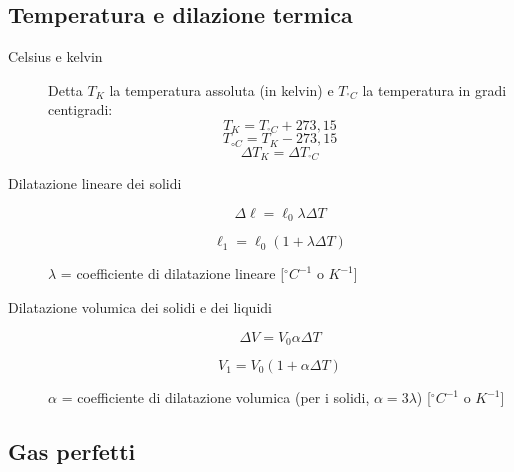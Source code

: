 \documentclass[a4paper,11pt,italian]{article}
\begin{document}
\subsection{Temperatura e dilazione termica}

\begin{description}
  \item[Celsius e kelvin]
  Detta $ T_K $ la temperatura assoluta (in kelvin) e $ T_{^{\circ}C} $ la temperatura in gradi centigradi:
  \[ T_K = T_{^{\circ}C} + 273,15 \]
  \[ T_{{\circ}C} = T_{K} - 273,15 \]
  \[ \Delta T_K = \Delta T_{^{\circ}C} \]
  
  \item[Dilatazione lineare dei solidi] 
  \[ \Delta \ell = \ell_0 \lambda \Delta T \]
\begin{soloscientifico} %
  \[ \ell_1 = \ell_0 (1 + \lambda \Delta T) \]
\end{soloscientifico}   %
  $ \lambda $ = coefficiente di dilatazione lineare [$ ^{\circ}C^{-1} $ o $ K^{-1} $]
  
  \item[Dilatazione volumica dei solidi e dei liquidi] 
  \[ \Delta V = V_0 \alpha \Delta T \]
\begin{soloscientifico} %
  \[ V_1 = V_0 (1 + \alpha \Delta T) \]
\end{soloscientifico}   %
  $ \alpha $ = coefficiente di dilatazione volumica (per i solidi, $ \alpha = 3 \lambda $) [$ ^{\circ}C^{-1} $ o $ K^{-1} $]
\end{description}

\subsection{Gas perfetti}
\end{document}
